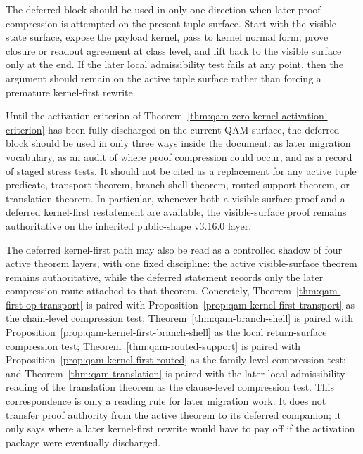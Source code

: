 \begin{remark}\label{rem:qam-zero-kernel-execution-rule}
The deferred block should be used in only one direction when later proof compression is attempted on the present tuple surface. Start with the visible state surface, expose the payload kernel, pass to kernel normal form, prove closure or readout agreement at class level, and lift back to the visible surface only at the end. If the later local admissibility test fails at any point, then the argument should remain on the active tuple surface rather than forcing a premature kernel-first rewrite.
\end{remark}

\begin{remark}\label{rem:qam-zero-kernel-present-use}
Until the activation criterion of Theorem~\ref{thm:qam-zero-kernel-activation-criterion} has been fully discharged on the current QAM surface, the deferred block should be used in only three ways inside the document: as later migration vocabulary, as an audit of where proof compression could occur, and as a record of staged stress tests. It should not be cited as a replacement for any active tuple predicate, transport theorem, branch-shell theorem, routed-support theorem, or translation theorem. In particular, whenever both a visible-surface proof and a deferred kernel-first restatement are available, the visible-surface proof remains authoritative on the inherited public-shape v3.16.0 layer.
\end{remark}


\begin{remark}\label{rem:qam-zero-kernel-correspondence}
The deferred kernel-first path may also be read as a controlled shadow of four active theorem layers, with one fixed discipline: the active visible-surface theorem remains authoritative, while the deferred statement records only the later compression route attached to that theorem. Concretely, Theorem~\ref{thm:qam-first-op-transport} is paired with Proposition~\ref{prop:qam-kernel-first-transport} as the chain-level compression test; Theorem~\ref{thm:qam-branch-shell} is paired with Proposition~\ref{prop:qam-kernel-first-branch-shell} as the local return-surface compression test; Theorem~\ref{thm:qam-routed-support} is paired with Proposition~\ref{prop:qam-kernel-first-routed} as the family-level compression test; and Theorem~\ref{thm:qam-translation} is paired with the later local admissibility reading of the translation theorem as the clause-level compression test. This correspondence is only a reading rule for later migration work. It does not transfer proof authority from the active theorem to its deferred companion; it only says where a later kernel-first rewrite would have to pay off if the activation package were eventually discharged.
\end{remark}


